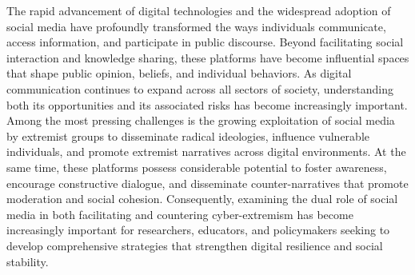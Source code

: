 \documentclass[10pt]{NSP1}
\begin{document}

\maketitle
\makeatletter
\let\newpage\JLTXorig@newpage
\let\clearpage\JLTXorig@clearpage
\let\cleardoublepage\JLTXorig@cleardoublepage
\makeatother


\par\vspace{6.0pt}\vspace{12.0pt}

The rapid advancement of digital technologies and the widespread adoption of social media have profoundly transformed the ways individuals communicate, access information, and participate in public discourse. Beyond facilitating social interaction and knowledge sharing, these platforms have become influential spaces that shape public opinion, beliefs, and individual behaviors. As digital communication continues to expand across all sectors of society, understanding both its opportunities and its associated risks has become increasingly important. Among the most pressing challenges is the growing exploitation of social media by extremist groups to disseminate radical ideologies, influence vulnerable individuals, and promote extremist narratives across digital environments. At the same time, these platforms possess considerable potential to foster awareness, encourage constructive dialogue, and disseminate counter-narratives that promote moderation and social cohesion. Consequently, examining the dual role of social media in both facilitating and countering cyber-extremism has become increasingly important for researchers, educators, and policymakers seeking to develop comprehensive strategies that strengthen digital resilience and social stability.
\end{document}
